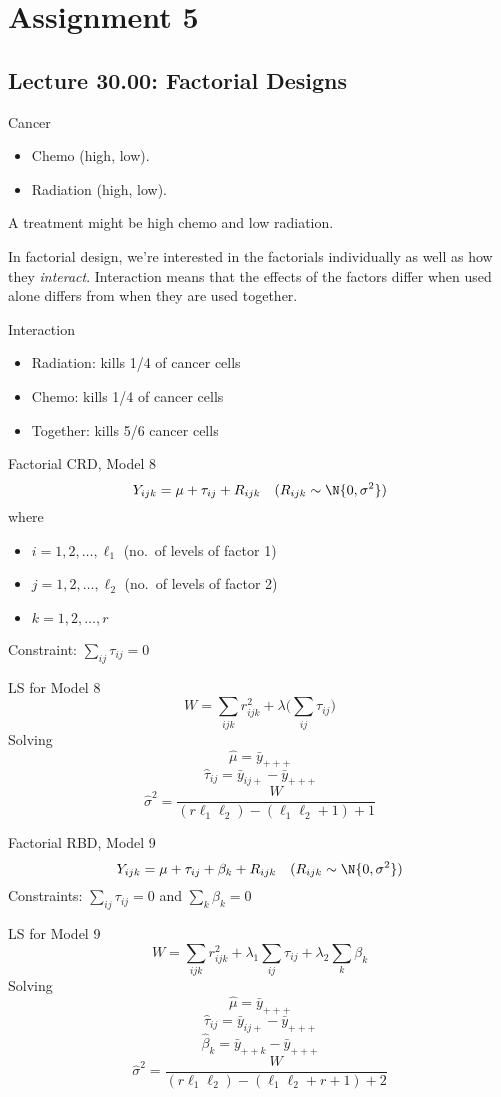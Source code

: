 \chapter{Assignment 5}
\section{Lecture 30.00: Factorial Designs}
\begin{Example}{Cancer}{}
    \begin{itemize}
        \item Chemo (high, low).
        \item Radiation (high, low).
    \end{itemize}
    A treatment might be high chemo and low radiation.
\end{Example}
In factorial design, we're interested in the factorials individually as
well as how they \emph{interact}. Interaction means that the effects of the factors
differ when used alone differs from when they are used together.
\begin{Example}{Interaction}{}
    \begin{itemize}
        \item Radiation: kills 1/4 of cancer cells
        \item Chemo: kills 1/4 of cancer cells
        \item Together: kills 5/6 cancer cells
    \end{itemize}
\end{Example}
\begin{Definition}{Factorial CRD, Model 8}{}
    \[ Y_{ijk}=\mu+\tau_{ij}+R_{ijk}\quad(R_{ijk}\sim \N{0,\sigma^2}) \]
    where
    \begin{itemize}
        \item $ i=1,2,\ldots,\ell_1 $ (no.\ of levels of factor 1)
        \item $ j=1,2,\ldots,\ell_2 $ (no.\ of levels of factor 2)
        \item $ k=1,2,\ldots,r $
    \end{itemize}
    Constraint: $ \sum_{ij}\tau_{ij}=0  $
\end{Definition}
\begin{Example}{LS for Model 8}{}
    \[ W=\sum_{ijk}r_{ijk}^2+\lambda\biggl(\sum_{ij}\tau_{ij} \biggr)  \]
    Solving
    \[ \hat{\mu}=\bar{y}_{+++} \]
    \[ \hat{\tau}_{ij}=\bar{y}_{ij+}-\bar{y}_{+++} \]
    \[ \hat{\sigma}^2=\frac{W}{(r\ell_1\ell_2)-(\ell_1\ell_2+1)+1}  \]
\end{Example}
\begin{Definition}{Factorial RBD, Model 9}{}
    \[ Y_{ijk}=\mu+\tau_{ij}+\beta_k+R_{ijk}\quad(R_{ijk}\sim \N{0,\sigma^2}) \]
    Constraints: $ \sum_{ij}\tau_{ij}=0 $ and $ \sum_{k} \beta_k=0 $
\end{Definition}
\begin{Example}{LS for Model 9}{}
    \[ W=\sum_{ijk}r_{ijk}^2+\lambda_1 \sum_{ij}\tau_{ij}+\lambda_2 \sum_{k}\beta_k  \]
    Solving
    \[ \hat{\mu}=\bar{y}_{+++} \]
    \[ \hat{\tau}_{ij}=\bar{y}_{ij+}-\bar{y}_{+++} \]
    \[ \hat{\beta}_k=\bar{y}_{++k}-\bar{y}_{+++} \]
    \[ \hat{\sigma}^2=\frac{W}{(r\ell_1\ell_2)-(\ell_1\ell_2+r+1)+2}  \]
\end{Example}
